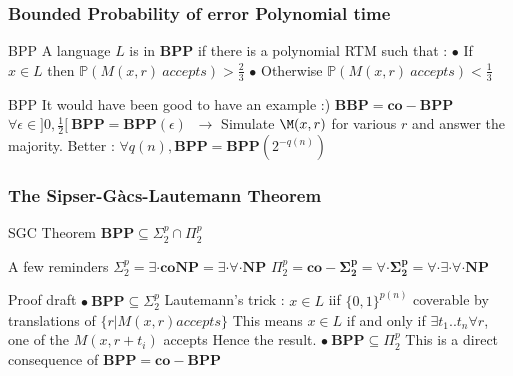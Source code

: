 \documentclass[pdf]{beamer}
\newcommand{\bb}[1]{\mathbb{#1}}
\begin{document}
\begin{frame}
\frametitle{Bounded Probability of error Polynomial time}

\begin{block}{BPP}
A language $L$ is in \textbf{BPP} if there is a polynomial RTM such that : \newline
$\bullet$ If $x \in L$ then $\bb{P}(M(x,r)~accepts)>\frac{2}{3}$ \newline
$\bullet$ Otherwise $\bb{P}(M(x,r)~accepts)<\frac{1}{3}$ \newline
\end{block}

\begin{exampleblock}{BPP}
It would have been good to have an example :) \newline
$\mathbf{BBP}=\mathbf{co-BPP}$\newline
$\forall \epsilon \in ]0,\frac{1}{2}[~ \mathbf{BPP}=\mathbf{BPP}(\epsilon)$ \newline
$ ~\rightarrow$ Simulate $\M(x,r)$ for various $r$ and answer the majority. \newline
Better : $\forall q(n), \mathbf{BPP}=\mathbf{BPP}(2^{-q(n)})$ \newline
\end{exampleblock}
\end{frame}

\begin{frame}
\frametitle{The Sipser-Gàcs-Lautemann Theorem}

\begin{alertblock}{SGC Theorem}
$\mathbf{BPP} \subseteq \Sigma^p_2 \cap \Pi^p_2$
\end{alertblock}

\begin{exampleblock}{A few reminders}
$\Sigma^p_2 = \exists \cdot \mathbf{coNP} = \exists \cdot \forall \cdot \mathbf{NP}$ \newline
$\Pi^p_2 = \mathbf{co-\Sigma^p_2} =\forall \cdot \mathbf{\Sigma^p_2} = \forall \cdot \exists \cdot \forall \cdot \mathbf{NP}$ \newline
\end{exampleblock}


\begin{exampleblock}{Proof draft}
$\bullet~\mathbf{BPP} \subseteq \Sigma^p_2$ \newline
Lautemann's trick : \newline $x \in L$ iif $\{0,1\}^{p(n)}$ coverable by translations of $\{r \vert M(x,r) accepts\}$\newline
This means $x \in L$  if and only if $\exists t_1..t_n \forall r$, one of the $M(x,r+t_i)$ accepts\newline
Hence the result. \newline
$\bullet~\mathbf{BPP} \subseteq \Pi^p_2$ \newline
This is a direct consequence of $\mathbf{BPP} = \mathbf{co-BPP}$
\end{exampleblock}

\end{frame}
\end{document}
